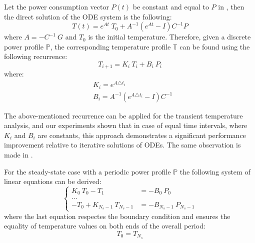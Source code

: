 Let the power consumption vector $P(t)$ be constant and equal to $P$ in , then the direct solution of the ODE system is the following:
\begin{equation} \label{eq:solution}
  T(t) = e^{A t} \; T_0 + A^{-1}(e^{A t} - I)C^{-1} P
\end{equation}
where $A = -C^{-1} \: G$ and $T_0$ is the initial temperature. Therefore, given a discrete power profile $\mathbb{P}$, the corresponding temperature profile $\mathbb{T}$ can be found using the following recurrence:
\begin{equation} \label{eq:recurrent-system}
  T_{i+1} = K_i \: T_i + B_i \: P_i
\end{equation}
where:
\begin{align*}
  & K_i = e^{A \triangle t_i} \\
  & B_i = A^{-1}(e^{A \triangle t_i} - I)C^{-1}
\end{align*}

The above-mentioned recurrence can be applied for the transient temperature analysis, and our experiments shown that in case of equal time intervals, where $K_i$ and $B_i$ are constants, this approach demonstrates a significant performance improvement relative to iterative solutions of ODEs. The same observation is made in \cite{thiele2011}.

For the steady-state case with a periodic power profile $\mathbb{P}$ the following system of linear equations can be derived:
\[
  \begin{cases}
    K_0 \: T_0 - T_1 & = -B_0 \: P_0 \\
    ... \\
    -T_0 + K_{N_s - 1} \: T_{N_s - 1} & = -B_{N_s - 1} \: P_{N_s - 1}
  \end{cases}
\]
where the last equation respectes the boundary condition and ensures the equality of temperature values on both ends of the overall period:
\begin{equation} \label{eq:boundary-condition}
  T_0 = T_{N_s}
\end{equation}

